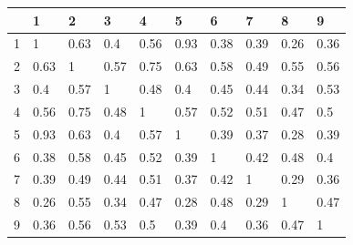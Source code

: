 \begin{tabular}{llllllllll}
\toprule
 & 1 & 2 & 3 & 4 & 5 & 6 & 7 & 8 & 9 \\
\midrule
1 & 1 & 0.63 & 0.4 & 0.56 & 0.93 & 0.38 & 0.39 & 0.26 & 0.36 \\
2 & 0.63 & 1 & 0.57 & 0.75 & 0.63 & 0.58 & 0.49 & 0.55 & 0.56 \\
3 & 0.4 & 0.57 & 1 & 0.48 & 0.4 & 0.45 & 0.44 & 0.34 & 0.53 \\
4 & 0.56 & 0.75 & 0.48 & 1 & 0.57 & 0.52 & 0.51 & 0.47 & 0.5 \\
5 & 0.93 & 0.63 & 0.4 & 0.57 & 1 & 0.39 & 0.37 & 0.28 & 0.39 \\
6 & 0.38 & 0.58 & 0.45 & 0.52 & 0.39 & 1 & 0.42 & 0.48 & 0.4 \\
7 & 0.39 & 0.49 & 0.44 & 0.51 & 0.37 & 0.42 & 1 & 0.29 & 0.36 \\
8 & 0.26 & 0.55 & 0.34 & 0.47 & 0.28 & 0.48 & 0.29 & 1 & 0.47 \\
9 & 0.36 & 0.56 & 0.53 & 0.5 & 0.39 & 0.4 & 0.36 & 0.47 & 1 \\
\bottomrule
\end{tabular}
